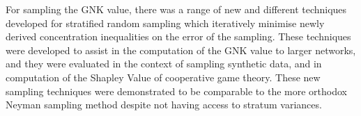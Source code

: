 For sampling the GNK value, there was a range of new and different techniques developed for stratified random sampling which iteratively minimise newly derived concentration inequalities on the error of the sampling.
These techniques were developed to assist in the computation of the GNK value to larger networks, and they were evaluated in the context of sampling synthetic data, and in computation of the Shapley Value of cooperative game theory.
These new sampling techniques were demonstrated to be comparable to the more orthodox Neyman sampling method despite not having access to stratum variances.




